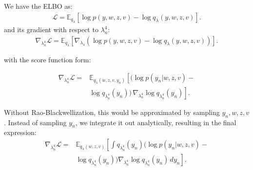 \documentclass{article}
\begin{document}
\begin{multicols}{2}
    We have the ELBO as:
    \begin{align*}
        \mathcal{L} = \mathbb{E}_{q_\lambda}\left[\log p(y, w, z, v) - \log q_\lambda(y, w, z, v)\right].
    \end{align*}
    and its gradient with respect to \(\lambda_n^4\):
    \begin{align*}
        \nabla_{\lambda_n^4}\mathcal{L} = \mathbb{E}_{q_\lambda}\left[\nabla_{\lambda_4}(\log p(y, w, z, v) - \log q_\lambda(y, w, z, v))\right].
    \end{align*}

    with the score function form:

    \begin{align*}
        \nabla_{\lambda_n^4}\mathcal{L} =& \mathbb{E}_{q_\lambda(w,z,v,y_n)}\left[(\log p(y_n|w,z,v)-\right.\\&\left.\log q_{\lambda_n^4}(y_n))\,\nabla_{\lambda_n^4}\log q_{\lambda_n^4}(y_n)\right].
    \end{align*}

    Without Rao-Blackwellization, this would be approximated by sampling $y_n, w,z,v$.
    Instead of sampling $y_n$, we integrate it out analytically, resulting in the final expression:
    \begin{align*}
        \nabla_{\lambda_n^4}\mathcal{L} 
        =& \mathbb{E}_{q_\lambda(w,z,v)}\left[\int q_{\lambda_n^4}(y_n) (\log p(y_n|w,z,v)-\right.\\&\left.\log q_{\lambda_n^4}(y_n)) \nabla_{\lambda_n^4}\log q_{\lambda_n^4}(y_n)\,dy_n\right].
    \end{align*}




\end{multicols}

\clearpage
{}
\printbibliography{}
\end{document}

